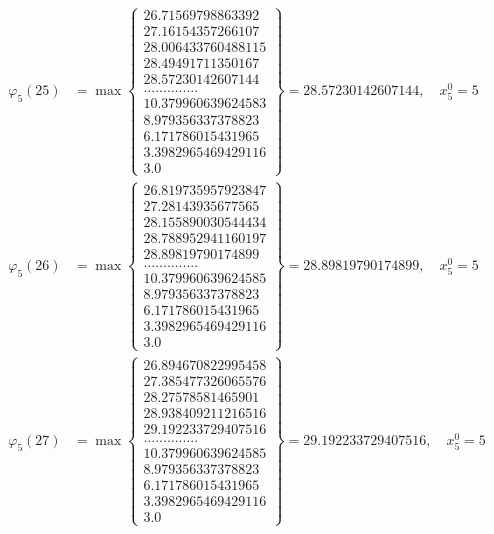 \documentclass{article}
\begin{document}
\begin{align*}
  
  
  
\varphi_{5}(25) &= \max \left\{ \begin{array}{c}
26.71569798863392 \\
 27.16154357266107 \\
 28.006433760488115 \\
 28.49491711350167 \\
 28.57230142607144 \\
 .............. \\
 10.379960639624583 \\
 8.979356337378823 \\
 6.171786015431965 \\
 3.3982965469429116 \\
 3.0
\end{array} \right\} = 28.57230142607144, \quad x_{5}^0 = 5\\
  
  
  
  
\varphi_{5}(26) &= \max \left\{ \begin{array}{c}
26.819735957923847 \\
 27.28143935677565 \\
 28.155890030544434 \\
 28.788952941160197 \\
 28.89819790174899 \\
 .............. \\
 10.379960639624585 \\
 8.979356337378823 \\
 6.171786015431965 \\
 3.3982965469429116 \\
 3.0
\end{array} \right\} = 28.89819790174899, \quad x_{5}^0 = 5\\
  
  
  
  
\varphi_{5}(27) &= \max \left\{ \begin{array}{c}
26.894670822995458 \\
 27.385477326065576 \\
 28.27578581465901 \\
 28.938409211216516 \\
 29.192233729407516 \\
 .............. \\
 10.379960639624585 \\
 8.979356337378823 \\
 6.171786015431965 \\
 3.3982965469429116 \\
 3.0
\end{array} \right\} = 29.192233729407516, \quad x_{5}^0 = 5\\
  

\end{align*}
\end{document}
